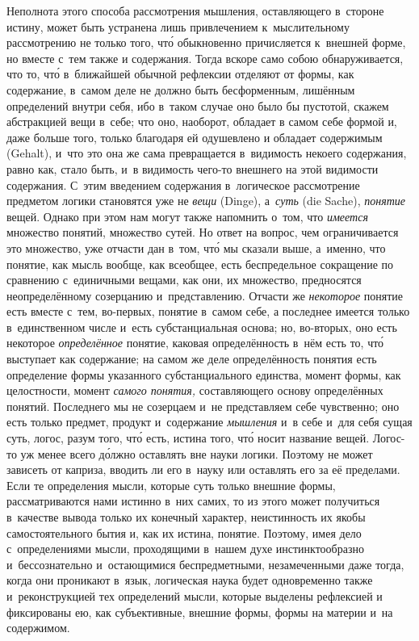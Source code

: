 Неполнота этого способа рассмотрения мышления, оставляющего в~стороне истину,
может быть устранена лишь привлечением к~мыслительному рассмотрению не только
того, чт\'{о} обыкновенно причисляется к~внешней форме, но вместе с~тем также и
содержания. Тогда вскоре само собою обнаруживается, что то, чт\'{о} в~ближайшей
обычной рефлексии отделяют от формы, как содержание, в~самом деле не должно
быть бесформенным, лишённым определений внутри себя, ибо в~таком случае оно
было бы пустотой, скажем абстракцией вещи в~себе; что оно, наоборот, обладает в
самом себе формой и, даже больше того, только благодаря ей одушевлено и
обладает содержимым (Gehalt), и~что это она же сама превращается в~видимость
некоего содержания, равно как, стало быть, и~в видимость чего-то внешнего на
этой видимости содержания. С~этим введением содержания в~логическое
рассмотрение предметом логики становятся уже не {\em вещи} (Dinge),
а~{\em суть} (die Sache), {\em понятие} вещей. Однако при этом нам могут также
напомнить о~том, что {\em имеется} множество понятий, множество сутей. Но ответ
на вопрос, чем ограничивается это множество, уже отчасти дан в~том, чт\'{о} мы
сказали выше, а~именно, что понятие, как мысль вообще, как всеобщее, есть
беспредельное сокращение по сравнению с~единичными вещами, как они, их
множество, предносятся неопределённому созерцанию и~представлению. Отчасти же
{\em некоторое} понятие есть вместе с~тем, во-первых, понятие в~самом себе, а
последнее имеется только в~единственном числе и~есть субстанциальная основа;
но, во-вторых, оно есть некоторое {\em определённое} понятие, каковая
определённость в~нём есть то, чт\'{о} выступает как содержание; на самом же
деле определённость понятия есть определение формы указанного субстанциального
единства, момент формы, как целостности, момент {\em самого понятия,}
составляющего основу определённых понятий. Последнего мы не созерцаем и~не
представляем себе чувственно; оно есть только предмет, продукт и~содержание
{\em мышления} и~в себе и~для себя сущая суть, логос, разум того, чт\'{о} есть,
истина того, чт\'{о} носит название вещей. Логос-то уж менее всего д\'{о}лжно
оставлять вне науки логики. Поэтому не может зависеть от каприза, вводить ли
его в~науку или оставлять его за её пределами. Если те определения мысли,
которые суть только внешние формы, рассматриваются нами истинно в~них самих, то
из этого может получиться в~качестве вывода только их конечный характер,
неистинность их якобы самостоятельного бытия и, как их истина, понятие.
Поэтому, имея дело с~определениями мысли, проходящими в~нашем духе
инстинктообразно и~бессознательно и~остающимися беспредметными, незамеченными
даже тогда, когда они проникают в~язык, логическая наука будет одновременно
также и~реконструкцией тех определений мысли, которые выделены рефлексией и
фиксированы ею, как субъективные, внешние формы, формы на материи и~на
содержимом.

